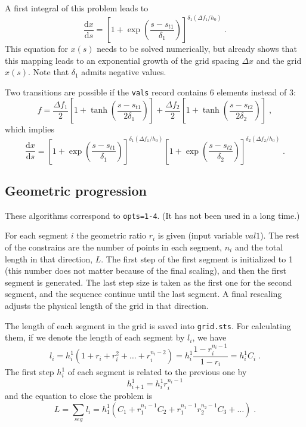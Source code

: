 A first integral of this problem leads to
\begin{equation}
\frac{\mathrm{d}x}{\mathrm{d}s} =
\left[1+\exp\left(\frac{s-s_{t1}}{\delta_1}\right)\right]^{\delta_1(\Delta f_1/h_0)} \;.
\end{equation}
This equation for $x(s)$ needs to be solved numerically, but already shows that this mapping leads to an exponential growth of the grid spacing $\Delta x$ and the grid $x(s)$. Note that $\delta_1$ admits negative values.

Two transitions are possible if the {\tt vals} record contains 6 elements instead of 3:
\begin{equation}
  f = \frac{\Delta f_1}{2}\left[ 1 + \tanh\left(\frac{s-s_{t1}}{2\delta_1}\right)\right]
  + \frac{\Delta f_2}{2}\left[ 1 + \tanh\left(\frac{s-s_{t2}}{2\delta_2}\right)\right] \;,
\end{equation}
which implies
\begin{equation}
  \frac{\mathrm{d}x}{\mathrm{d}s} =
  \left[1+\exp\left(\frac{s-s_{t1}}{\delta_1}\right)\right]^{\delta_1(\Delta f_1/h_0)}
  \left[1+\exp\left(\frac{s-s_{t2}}{\delta_2}\right)\right]^{\delta_2(\Delta f_2/h_0)}\;.
\end{equation}

\subsection{Geometric progression}

These algorithms correspond to {\tt opts=1-4}. (It has not been used in a long time.)

For each segment $i$ the geometric ratio $r_i$ is given (input variable $val1$). The rest of the constrains are the number of points in each segment, $n_i$ and the total length in that direction, $L$.  The first step of the first segment is initialized to 1 (this number does not matter because of the final scaling), and then the first segment is generated. The last step size is taken as the first one for the second segment, and the sequence continue until the last segment. A final rescaling adjusts the physical length of the grid in that direction.

The length of each segment in the grid is saved into {\tt grid.sts}. For calculating them, if we denote the length of each segment by $l_i$, we have
\begin{equation}
l_i = h_i^1(1+r_i+r_i^2+\ldots+r_i^{n_i-2})=
h_i^1\frac{1-r_i^{n_i-1}}{1-r_i}=h_i^1C_i \;.
\end{equation}
The first step $h_i^1$ of each segment is related to the previous one by
\begin{equation}
h_{i+1}^1 = h_i^1 r_i^{n_i-1}
\end{equation}
and the equation to close the problem is
\begin{equation}
L=\sum_{seg}l_i=h_1^1\left( C_1 + r_1^{n_1-1}C_2 +
r_1^{n_1-1}r_2^{n_2-1}C_3 + \ldots \right) \;.
\end{equation}
